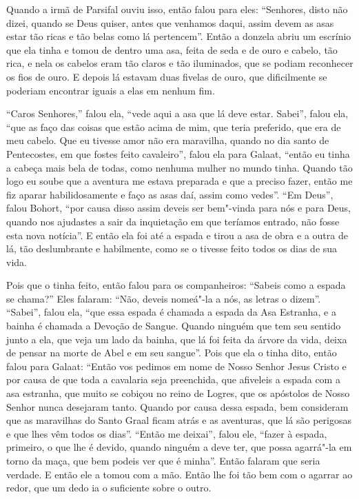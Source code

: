 Quando a irmã de Parsifal ouviu isso, então falou para eles: “Senhores, disto
não dizei, quando se Deus quiser, antes que venhamos daqui, assim devem as asas
estar tão ricas e tão belas como lá pertencem”. Então a donzela abriu um
escrínio que ela tinha e tomou de dentro uma asa, feita de seda e de ouro e
cabelo, tão rica, e nela os cabelos eram tão claros e tão iluminados, que se
podiam reconhecer os fios de ouro. E depois lá estavam duas fivelas de ouro,
que dificilmente se poderiam encontrar iguais a elas em nenhum fim.

“Caros Senhores,” falou ela, “vede aqui a asa que lá deve estar. Sabei”, falou
ela, “que as faço das coisas que estão acima de mim, que teria preferido, que
era de meu cabelo. Que eu tivesse amor não era maravilha, quando no dia santo
de Pentecostes, em que fostes feito cavaleiro”, falou ela para Galaat, “então
eu tinha a cabeça mais bela de todas, como nenhuma mulher no mundo tinha.
Quando tão logo eu soube que a aventura me estava preparada e que a preciso
fazer, então me fiz aparar habilidosamente e faço as asas daí, assim como
vedes”. “Em Deus”, falou Bohort, “por causa disso assim deveis ser bem"-vinda
para nós e para Deus, quando nos ajudastes a sair da inquietação em que
teríamos entrado, não fosse esta nova notícia”. E então ela foi até a espada e
tirou a asa de obra e a outra de lá, tão deslumbrante e habilmente, como se o
tivesse feito todos os dias de sua vida.

Pois que o tinha feito, então falou para os companheiros: “Sabeis como a espada
se chama?” Eles falaram: “Não, deveis nomeá"-la a nós, as letras o dizem”.
“Sabei”, falou ela, “que essa espada é chamada a espada da Asa Estranha, e a
bainha é chamada a Devoção de Sangue. Quando ninguém que tem seu sentido junto
a ela, que veja um lado da bainha, que lá foi feita da árvore da vida, deixa de
pensar na morte de Abel e em seu sangue”. Pois que ela o tinha dito, então
falou para Galaat: “Então vos pedimos em nome de Nosso Senhor Jesus Cristo e
por causa de que toda a cavalaria seja preenchida, que afiveleis a espada com a
asa estranha, que muito se cobiçou no reino de Logres, que os apóstolos de
Nosso Senhor nunca desejaram tanto. Quando por causa dessa espada, bem
consideram que as maravilhas do Santo Graal ficam atrás e as aventuras, que lá
são perigosas e que lhes vêm todos os dias”. “Então me deixai”, falou
ele, “fazer à espada, primeiro, o que lhe é devido, quando ninguém a deve ter,
que possa agarrá"-la em torno da maça, que bem podeis ver que é minha”. Então
falaram que seria verdade. E então ele a tomou com a mão. Então lhe foi tão bem
com o agarrar ao redor, que um dedo ia o suficiente sobre o outro.

